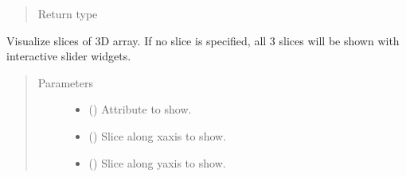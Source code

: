 \documentclass[letterpaper,10pt,english]{sphinxmanual}
\begin{document}
\begin{fulllineitems}
\begin{fulllineitems}
\begin{quote}
\begin{description}
\item[{Return type}] \leavevmode
{\hyperref[\detokenize{api/base_classes:geology.src.base_spatial.SpatialComponent}]{}}

\end{description}\end{quote}

\end{fulllineitems}


\begin{fulllineitems}
\label{\detokenize{api/rock:geology.src.Rock.show_cube}}
Visualize slices of 3D array. If no slice is specified, all 3 slices
will be shown with interactive slider widgets.
\begin{quote}\begin{description}
\item[{Parameters}] \leavevmode\begin{itemize}
\item {} 
 () \textendash{} Attribute to show.

\item {} 
 (\sphinxstyleliteralemphasis{\sphinxupquote{, }}) \textendash{} Slice along x\sphinxhyphen{}axis to show.

\item {} 
 (\sphinxstyleliteralemphasis{\sphinxupquote{, }}) \textendash{} Slice along y\sphinxhyphen{}axis to show.


\end{itemize}
\end{description}
\end{quote}
\end{fulllineitems}
\end{fulllineitems}
\end{document}
